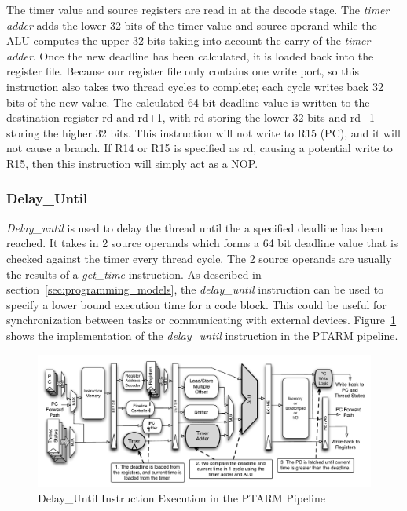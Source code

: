 The timer value and source registers are read in at the decode stage. 
The \emph{timer adder} adds the lower 32 bits of the timer value and source operand while the ALU computes the upper 32 bits taking into account the carry of the \emph{timer adder}.
Once the new deadline has been calculated, it is loaded back into the register file. 
Because our register file only contains one write port, so this instruction also takes two thread cycles to complete; each cycle writes back 32 bits of the new value. 
The calculated 64 bit deadline value is written to the destination register rd and rd+1, with rd storing the lower 32 bits and rd+1 storing the higher 32 bits. 
This instruction will not write to R15 (PC), and it will not cause a branch. 
If R14 or R15 is specified as rd, causing a potential write to R15, then this instruction will simply act as a NOP.


\subsubsection{Delay\_Until}    
\emph{Delay\_until} is used to delay the thread until the a specified deadline has been reached.
It takes in 2 source operands which forms a 64 bit deadline value that is checked against the timer every thread cycle.
The 2 source operands are usually the results of a \emph{get\_time} instruction.  
As described in section~\ref{sec:programming_models}, the \emph{delay\_until} instruction can be used to specify a lower bound execution time for a code block.
This could be useful for synchronization between tasks or communicating with external devices.
Figure~\ref{fig:delay_until_pipeline_implementation} shows the implementation of the \emph{delay\_until} instruction in the PTARM pipeline.       
\begin{figure}
  \vspace{-20pt}
  \begin{center}
    \includegraphics[scale=.54]{figs/delay_until_pipeline_implementation}
  \end{center}
  \vspace{-20pt}
  \caption{Delay\_Until Instruction Execution in the PTARM Pipeline}
  \label{fig:delay_until_pipeline_implementation}
\end{figure}

